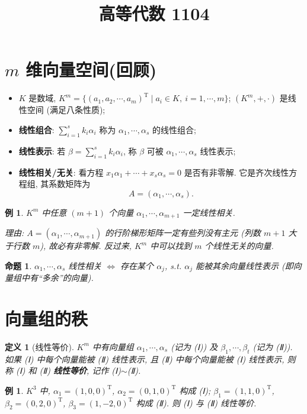 \documentclass[UTF8,11pt]{ctexart}
\title{高等代数 1104}
\date{}
\theoremstyle{cnthm}
\newtheorem{prop}[thm]{命题}
\newtheorem{defn}[thm]{定义}
\newtheorem{exa}[thm]{例}
\begin{document}
\maketitle

\section{$m$ 维向量空间(回顾)}

\begin{itemize}
\item $K$ 是数域, $K^m=\{(a_1,a_2,\cdots,a_m)^{\mathrm T}\mid a_i\in K,\ i=1,\cdots,m\}$; $(K^m,+,\cdot)$ 是线性空间 (满足八条性质);
\item \textbf{线性组合}: $\sum_{i=1}^{s}k_i\alpha_i$ 称为 $\alpha_1,\cdots,\alpha_s$ 的线性组合;
\item \textbf{线性表示}: 若 $\beta=\sum_{i=1}^{s}k_i\alpha_i$, 称 $\beta$ 可被 $\alpha_1,\cdots,\alpha_s$ 线性表示;
\item \textbf{线性相关/无关}: 看方程 $x_1\alpha_1+\cdots+x_s\alpha_s=0$ 是否有非零解. 它是齐次线性方程组, 其系数矩阵为
\[
A=(\alpha_1,\cdots,\alpha_s).
\]
\end{itemize}

\begin{exa}
$K^m$ 中任意 $(m+1)$ 个向量 $\alpha_1,\cdots,\alpha_{m+1}$ 一定线性相关.

理由: $A=(\alpha_1,\cdots,\alpha_{m+1})$ 的行阶梯形矩阵一定有些列没有主元 (列数 $m+1$ 大于行数 $m$), 故必有非零解. 反过来, $K^m$ 中可以找到 $m$ 个线性无关的向量.
\end{exa}

\begin{prop}
$\alpha_1,\cdots,\alpha_s$ 线性相关 $\iff$ 存在某个 $\alpha_j$, s.t. $\alpha_j$ 能被其余向量线性表示 (即向量组中有``多余''的向量).
\end{prop}

\section{向量组的秩}

\begin{defn}[线性等价]
$K^m$ 中有向量组 $\alpha_1,\cdots,\alpha_s$ (记为 (Ⅰ)) 及 $\beta_1,\cdots,\beta_t$ (记为 (Ⅱ)). 如果 (Ⅰ) 中每个向量能被 (Ⅱ) 线性表示, 且 (Ⅱ) 中每个向量能被 (Ⅰ) 线性表示, 则称 (Ⅰ) 和 (Ⅱ) \textbf{线性等价}, 记作 (Ⅰ)$\sim$(Ⅱ).
\end{defn}

\begin{exa}
$K^3$ 中, $\alpha_1=(1,0,0)^{\mathrm T}$, $\alpha_2=(0,1,0)^{\mathrm T}$ 构成 (Ⅰ); $\beta_1=(1,1,0)^{\mathrm T}$, $\beta_2=(0,2,0)^{\mathrm T}$, $\beta_3=(1,-2,0)^{\mathrm T}$ 构成 (Ⅱ). 则 (Ⅰ) 与 (Ⅱ) 线性等价.
\end{exa}
\end{document}
